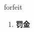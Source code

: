 
\begin{frame}
{\huge forfeit}
\begin{center}
\begin{enumerate}\Large
  \item \textbf{罚金}
\end{enumerate}
\end{center}
\end{frame}
